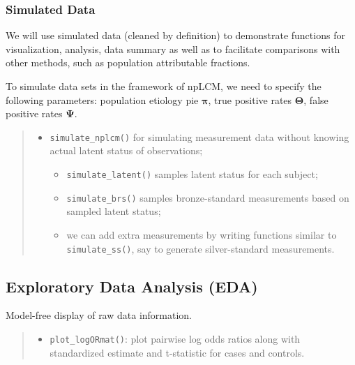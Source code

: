 \documentclass[article]{jss}
\begin{document}
\subsubsection{Simulated Data}\label{simulated-data}

We will use simulated data (cleaned by definition) to demonstrate
functions for visualization, analysis, data summary as well as to
facilitate comparisons with other methods, such as population
attributable fractions.

To simulate data sets in the framework of npLCM, we need to specify the
following parameters: population etiology pie \(\mathbf{\pi}\), true
positive rates \(\mathbf{\Theta}\), false positive rates
\(\mathbf{\Psi}\).

\begin{quote}
\begin{itemize}
\itemsep1pt\parskip0pt
\item
  \texttt{simulate\_nplcm()} for simulating measurement data without
  knowing actual latent status of observations;

  \begin{itemize}
  \itemsep1pt\parskip0pt
  \item
    \texttt{simulate\_latent()} samples latent status for each subject;
  \item
    \texttt{simulate\_brs()} samples bronze-standard measurements based
    on sampled latent status;
  \item
    we can add extra measurements by writing functions similar to
    \texttt{simulate\_ss()}, say to generate silver-standard
    measurements.
  \end{itemize}
\end{itemize}
\end{quote}

\subsection{Exploratory Data Analysis
(EDA)}\label{exploratory-data-analysis-eda}

Model-free display of raw data information.

\begin{quote}
\begin{itemize}
\itemsep1pt\parskip0pt
\item
  \texttt{plot\_logORmat()}: plot pairwise log odds ratios along with
  standardized estimate and t-statistic for cases and controls.
\end{itemize}
\end{quote}
\end{document}
